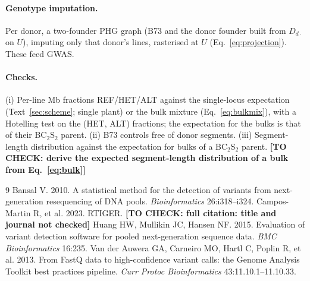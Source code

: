 \documentclass[11pt]{article}
\newcommand{\todo}[1]{\textbf{[TO CHECK: #1]}}
\begin{document}
\paragraph{Genotype imputation.} Per donor, a two-founder PHG graph (B73 and the donor founder built from $D_{d\cdot}$ on $U$), imputing
only that donor's lines, rasterised at $U$ (Eq.~\eqref{eq:projection}). These feed GWAS.

\paragraph{Checks.} (i) Per-line Mb fractions REF/HET/ALT against the single-locus expectation (Text~\ref{sec:scheme}; single plant) or
the bulk mixture (Eq.~\eqref{eq:bulkmix}), with a Hotelling test on the (HET, ALT) fractions; the expectation for the
bulks is that of their BC$_2$S$_2$ parent. (ii) B73 controls free of donor segments. (iii) Segment-length distribution against the
expectation for bulks of a BC$_2$S$_2$ parent. \todo{derive the expected segment-length distribution of a bulk from Eq.~\eqref{eq:bulk}}


\begin{thebibliography}{9}
 Bansal V. 2010. A statistical method for the detection of variants from next-generation
resequencing of DNA pools. \textit{Bioinformatics} 26:i318--i324.
 Campos-Martin R, et al. 2023. RTIGER. \todo{full citation: title and journal not checked}
 Huang HW, Mullikin JC, Hansen NF. 2015. Evaluation of variant detection software for pooled
next-generation sequence data. \textit{BMC Bioinformatics} 16:235.
 Van der Auwera GA, Carneiro MO, Hartl C, Poplin R, et al. 2013. From FastQ data to
high-confidence variant calls: the Genome Analysis Toolkit best practices pipeline. \textit{Curr Protoc Bioinformatics} 43:11.10.1--11.10.33.
\end{thebibliography}
\end{document}
